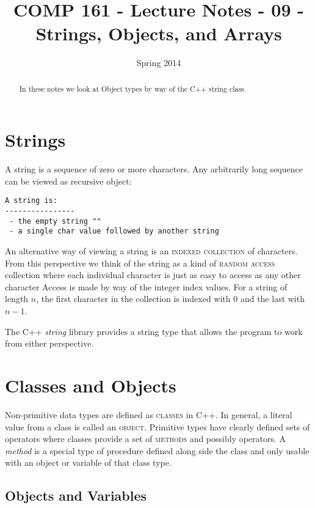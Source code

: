 \documentclass[]{tufte-handout}
\title{COMP 161 - Lecture Notes - 09 - Strings, Objects, and Arrays}
\date{Spring 2014}
\begin{document}
 
\maketitle

\begin{abstract}
In these notes we look at Object types by way of the C++ string class.
\end{abstract}

\section{Strings}

A string is a sequence of zero or more characters. Any arbitrarily long sequence can be viewed as recursive object:
\begin{verbatim}
A string is:
----------------
 - the empty string ""
 - a single char value followed by another string
\end{verbatim}

An alternative way of viewing a string is an \textsc{indexed collection} of characters. From this perspective we think of the string as a kind of \textsc{random access} collection where each individual character is just as easy to access as any other character  Access is made by way of the integer index values.  For a string of length $n$, the first character in the collection is indexed with $0$ and the last with $n-1$. 

The C++ \textit{string} library provides a string type that allows the program to work from either perspective. 

\section{Classes and Objects}

Non-primitive data types are defined as \textsc{classes} in C++. In general, a literal value from a class is called an \textsc{object}.  Primitive types have clearly defined sets of operators where classes provide a set of \textsc{methods} and possibly operators.  A \textit{method} is a special type of procedure defined along side the class and only usable with an object or variable of that class type. 

\subsection{Objects and Variables}
\end{document}
